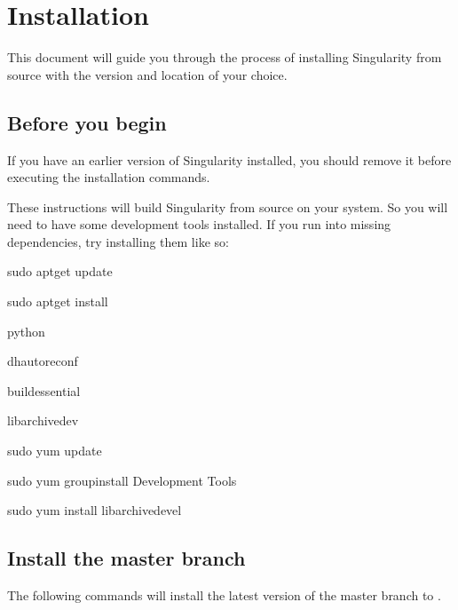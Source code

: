 \documentclass[letterpaper,10pt,english]{sphinxmanual}
\begin{document}
\chapter{Installation}
\label{\detokenize{installation:installation}}\label{\detokenize{installation::doc}}\label{\detokenize{installation:sec-installation}}
This document will guide you through the process of installing
Singularity from source with the version and location of your choice.


\section{Before you begin}
\label{\detokenize{installation:before-you-begin}}
If you have an earlier version of Singularity installed, you should
remove it before executing the installation commands.

These instructions will build Singularity from source on your system.
So you will need to have some development tools installed. If you run
into missing dependencies, try installing them like so:

%
\begin{sphinxVerbatim}[commandchars=\\\{\}]
\PYGZdl{} sudo apt\PYGZhy{}get update \PYGZam{}\PYGZam{} \PYGZbs{}

    sudo apt\PYGZhy{}get install \PYGZbs{}

    python \PYGZbs{}

    dh\PYGZhy{}autoreconf \PYGZbs{}

    build\PYGZhy{}essential \PYGZbs{}

    libarchive\PYGZhy{}dev
\end{sphinxVerbatim}

%
\begin{sphinxVerbatim}[commandchars=\\\{\}]
\PYGZdl{} sudo yum update \PYGZam{}\PYGZam{} \PYGZbs{}

    sudo yum groupinstall \PYGZsq{}Development Tools\PYGZsq{} \PYGZam{}\PYGZam{} \PYGZbs{}

    sudo yum install libarchive\PYGZhy{}devel
\end{sphinxVerbatim}


\section{Install the master branch}
\label{\detokenize{installation:install-the-master-branch}}
The following commands will install the latest version of the  master branch to .
\end{document}
